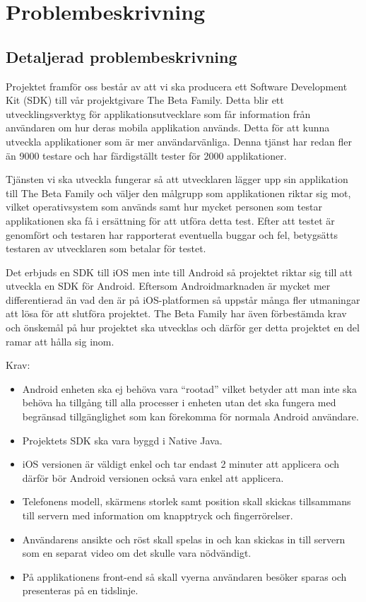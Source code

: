 \section{Problembeskrivning}
\subsection{Detaljerad problembeskrivning}
Projektet framför oss består av att vi ska producera ett Software Development Kit (SDK) till vår projektgivare The Beta Family. Detta blir ett utvecklingsverktyg för applikationsutvecklare som får information från användaren om hur deras mobila applikation används. Detta för att kunna utveckla applikationer som är mer användarvänliga. Denna tjänst har redan fler än 9000 testare och har färdigställt tester för 2000 applikationer.

Tjänsten vi ska utveckla fungerar så att utvecklaren lägger upp sin applikation till The Beta Family och väljer den målgrupp som applikationen riktar sig mot, vilket operativsystem som används samt hur mycket personen som testar applikationen ska få i ersättning för att utföra detta test. Efter att testet är genomfört och testaren har rapporterat eventuella buggar och fel, betygsätts testaren av utvecklaren som betalar för testet.

Det erbjuds en SDK till iOS men inte till Android så projektet riktar sig till att utveckla en SDK för Android. Eftersom Androidmarknaden är mycket mer differentierad än vad den är på iOS-platformen så uppstår många fler utmaningar att lösa för att slutföra projektet. The Beta Family har även förbestämda krav och önskemål på hur projektet ska utvecklas och därför ger detta projektet en del ramar att hålla sig inom.

Krav:

\begin{itemize}
	\item Android enheten ska ej behöva vara “rootad” vilket betyder att man inte ska behöva ha tillgång till alla processer i enheten utan det ska fungera med begränsad tillgänglighet som kan förekomma för normala Android användare.
	\item Projektets SDK ska vara byggd i Native Java.
	\item iOS versionen är väldigt enkel och tar endast 2 minuter att applicera och därför bör Android versionen också vara enkel att applicera.
	\item Telefonens modell, skärmens storlek samt position skall skickas tillsammans till servern med information om knapptryck och fingerrörelser.
	\item Användarens ansikte och röst skall spelas in och kan skickas in till servern som en separat video om det skulle vara nödvändigt.
	\item På applikationens front-end så skall vyerna användaren besöker sparas och presenteras på en tidslinje.
\end{itemize}


